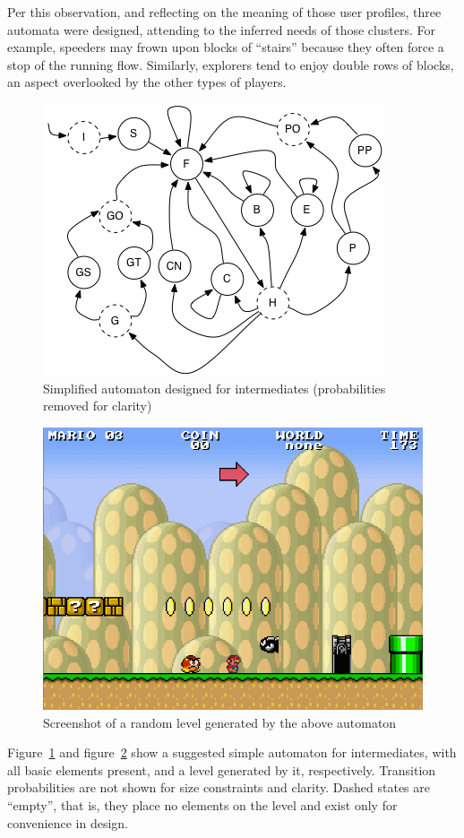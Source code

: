 \documentclass[conference]{IEEEtran}
\begin{document}
Per this observation, and reflecting on the meaning of those user profiles, three automata were designed, attending to the inferred needs of those clusters. For example, speeders may frown upon blocks of ``stairs'' because they often force a stop of the running flow. Similarly, explorers tend to enjoy double rows of blocks, an aspect overlooked by the other types of players. 

\begin{figure}[htp]
\centerline{\includegraphics[width=0.75\columnwidth]{automaton.png}}
\caption{Simplified automaton designed for intermediates (probabilities removed for clarity)}
\label{automaton}
\end{figure}

\begin{figure}[htp]
\centerline{\includegraphics[width=0.75\columnwidth]{screenshot.png}}
\caption{Screenshot of a random level generated by the above automaton}
\label{screenshot}
\end{figure}

Figure~\ref{automaton} and figure~\ref{screenshot} show a suggested simple automaton for intermediates, with all basic elements present, and a level generated by it, respectively. Transition probabilities are not shown for size constraints and clarity. Dashed states are ``empty'', that is, they place no elements on the level and exist only for convenience in design.
\end{document}
